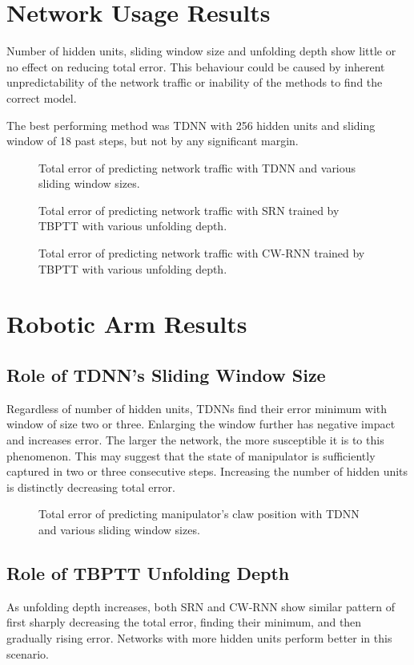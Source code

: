 \documentclass[12pt,oneside]{fithesis2}
\begin{document}
\section{Network Usage Results}
Number of hidden units, sliding window size and unfolding depth show little or no effect on reducing total error. This behaviour could be caused by inherent unpredictability of the network traffic or inability of the methods to find the correct model.\par
The best performing method was TDNN with 256 hidden units and sliding window of 18 past steps, but not by any significant margin.

	\begin{figure}[H]
		\caption{Total error of predicting network traffic with TDNN and various sliding window sizes.}
		

		\caption{Total error of predicting network traffic with SRN trained by TBPTT with various unfolding depth.}
		

		\caption{Total error of predicting network traffic with CW-RNN trained by TBPTT with various unfolding depth.}
		
	\end{figure}	
	
\section{Robotic Arm Results}
\subsection{Role of TDNN's Sliding Window Size}
Regardless of number of hidden units, TDNNs find their error minimum with window of size two or three. Enlarging the  window further has negative impact and increases error. The larger the network, the more susceptible it is to this phenomenon. This may suggest that the state of manipulator is sufficiently captured in two or three consecutive steps. Increasing the number of hidden units is distinctly decreasing total error.

	\begin{figure}[H]
		\caption{Total error of predicting manipulator's claw position with TDNN and various sliding window sizes.}
		
	\end{figure}
	
\subsection{Role of TBPTT Unfolding Depth}
As unfolding depth increases, both SRN and CW-RNN show similar pattern of first sharply decreasing the total error, finding their minimum, and then gradually rising error. Networks with more hidden units perform better in this scenario. \par
\end{document}
